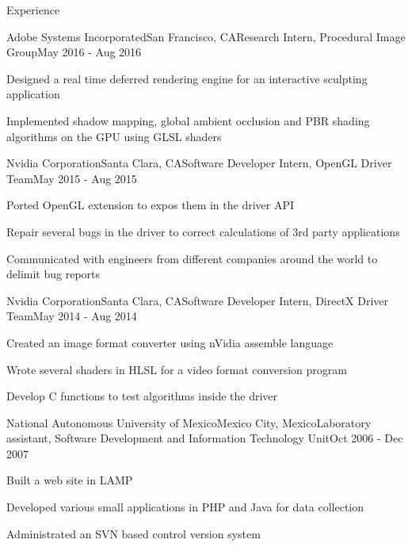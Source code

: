 \documentclass{resume} %
\begin{document}

\begin{rSection}{Experience}

\begin{rSubsection}{Adobe Systems Incorporated}{San Francisco, CA}{Research Intern, Procedural Image Group}{May 2016 - Aug 2016}
\item Designed a real time deferred rendering engine for an interactive sculpting application
\item Implemented shadow mapping, global ambient occlusion and PBR shading algorithms on the GPU using GLSL shaders
\end{rSubsection}

\begin{rSubsection}{Nvidia Corporation}{Santa Clara, CA}{Software Developer Intern, OpenGL Driver Team}{May 2015 - Aug 2015}
\item Ported OpenGL extension to expos them in the driver API
\item Repair several bugs in the driver to correct calculations of 3rd party applications
\item Communicated with engineers from different companies around the world to delimit bug reports
\end{rSubsection}

\begin{rSubsection}{Nvidia Corporation}{Santa Clara, CA}{Software Developer Intern, DirectX Driver Team}{May 2014 - Aug 2014}
\item Created an image format converter using nVidia assemble language
\item Wrote several shaders in HLSL for a video format conversion program
\item Develop C functions to test algorithms inside the driver
\end{rSubsection}

\begin{rSubsection}{National Autonomous University of Mexico}{Mexico City, Mexico}{Laboratory assistant, Software Development and Information Technology Unit}{Oct 2006 - Dec 2007}
\item Built a web site in LAMP
\item Developed various small applications in PHP and Java for data collection
\item Administrated an SVN based control version system
\end{rSubsection}


\end{rSection}
\end{document}
